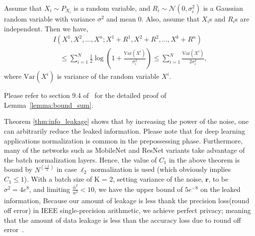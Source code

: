 \begin{lemma}\label{lemma:bound_sum}
Assume that $X_i\sim P_{X_i}$ is a random variable, and $R_i\sim \mathcal N(0,\sigma_i^2)$ is a Gaussian random variable with variance $\sigma^2$ and mean $0$. Also, assume that $X_i$s and $R_i$s are independent. Then we have,
\begin{align}
    &I(X^1, X^2,..., X^n;X^1+R^1,X^2+R^2,...,X^k+R^n)  \nonumber\\ & \quad \leq\sum_{i=1}^N \frac 1 2 \log\left(1+\frac{\text{Var}(X^i)}{\sigma^2_{i}}\right)\leq \sum_{i=1}^N  \frac{\text{Var}(X^i)}{2\sigma^2_{i}},
\end{align}
where $\text{Var}(X^i)$ is variance of the random variable $X^i$.
\end{lemma}

Please refer to section 9.4 of~\cite{cover1999elements} for the detailed proof of Lemma~\eqref{lemma:bound_sum}.


Theorem \ref{thm:info_leakage} shows that by increasing the power of the noise, one can arbitrarily reduce the leaked information. Please note that for deep learning applications normalization is common in the prepossessing phase. Furthermore, many of the networks such as MobileNet and ResNet variants take advantage of the batch normalization layers. Hence, the value of $C_1$ in the above theorem is bound by $N^{(\frac{-1}{2})}$ in case $\ell_2$ normalization is used (which obviously implies $C_1 \leq 1$). With a batch size of K = 2, setting variance of the noise, $\mathbf r$, to be $\sigma^2=4e^8$, and limiting $\frac{\bar\alpha^2}{\underset{\bar{}} {\alpha^2}} < 10$, we have the upper bound of $5e^{-8}$ on the leaked information, %
Because our amount of leakage is less thank the precision loss(round off error) in IEEE single-precision arithmetic, we achieve perfect privacy; meaning that the amount of data leakage is less than the accuracy loss due to round off error~\citep{guo2020secure}.

